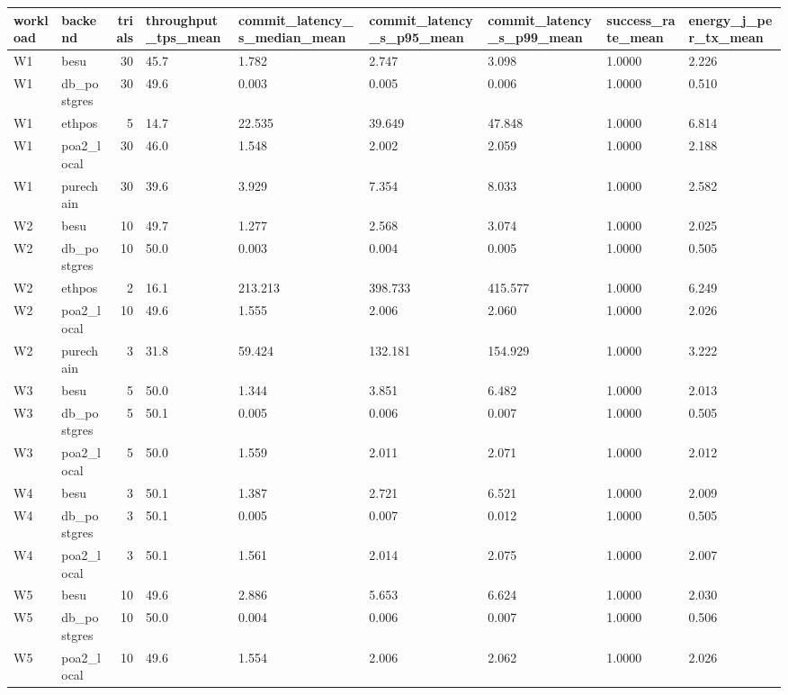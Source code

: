 \begin{tabular}{llrllllll}
\toprule
workload & backend & trials & throughput\_tps\_mean & commit\_latency\_s\_median\_mean & commit\_latency\_s\_p95\_mean & commit\_latency\_s\_p99\_mean & success\_rate\_mean & energy\_j\_per\_tx\_mean \\
\midrule
W1 & besu & 30 & 45.7 & 1.782 & 2.747 & 3.098 & 1.0000 & 2.226 \\
W1 & db\_postgres & 30 & 49.6 & 0.003 & 0.005 & 0.006 & 1.0000 & 0.510 \\
W1 & ethpos & 5 & 14.7 & 22.535 & 39.649 & 47.848 & 1.0000 & 6.814 \\
W1 & poa2\_local & 30 & 46.0 & 1.548 & 2.002 & 2.059 & 1.0000 & 2.188 \\
W1 & purechain & 30 & 39.6 & 3.929 & 7.354 & 8.033 & 1.0000 & 2.582 \\
W2 & besu & 10 & 49.7 & 1.277 & 2.568 & 3.074 & 1.0000 & 2.025 \\
W2 & db\_postgres & 10 & 50.0 & 0.003 & 0.004 & 0.005 & 1.0000 & 0.505 \\
W2 & ethpos & 2 & 16.1 & 213.213 & 398.733 & 415.577 & 1.0000 & 6.249 \\
W2 & poa2\_local & 10 & 49.6 & 1.555 & 2.006 & 2.060 & 1.0000 & 2.026 \\
W2 & purechain & 3 & 31.8 & 59.424 & 132.181 & 154.929 & 1.0000 & 3.222 \\
W3 & besu & 5 & 50.0 & 1.344 & 3.851 & 6.482 & 1.0000 & 2.013 \\
W3 & db\_postgres & 5 & 50.1 & 0.005 & 0.006 & 0.007 & 1.0000 & 0.505 \\
W3 & poa2\_local & 5 & 50.0 & 1.559 & 2.011 & 2.071 & 1.0000 & 2.012 \\
W4 & besu & 3 & 50.1 & 1.387 & 2.721 & 6.521 & 1.0000 & 2.009 \\
W4 & db\_postgres & 3 & 50.1 & 0.005 & 0.007 & 0.012 & 1.0000 & 0.505 \\
W4 & poa2\_local & 3 & 50.1 & 1.561 & 2.014 & 2.075 & 1.0000 & 2.007 \\
W5 & besu & 10 & 49.6 & 2.886 & 5.653 & 6.624 & 1.0000 & 2.030 \\
W5 & db\_postgres & 10 & 50.0 & 0.004 & 0.006 & 0.007 & 1.0000 & 0.506 \\
W5 & poa2\_local & 10 & 49.6 & 1.554 & 2.006 & 2.062 & 1.0000 & 2.026 \\
\bottomrule
\end{tabular}
